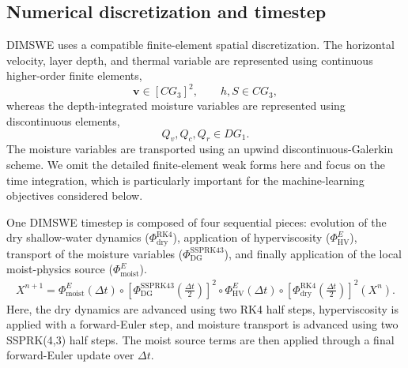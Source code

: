 \documentclass[12pt]{article}
\begin{document}
\subsection{Numerical discretization and timestep}
DIMSWE uses a compatible finite-element spatial discretization. The horizontal velocity, layer depth, and thermal variable are represented using continuous higher-order finite elements,
\begin{equation}
	\mathbf{v}\in[CG_3]^2,
	\qquad
	h,S\in CG_3,
\end{equation}
whereas the depth-integrated moisture variables are represented using discontinuous elements,
\begin{equation}
	Q_v,Q_c,Q_r\in DG_1.
\end{equation}
The moisture variables are transported using an upwind discontinuous-Galerkin scheme. We omit the detailed finite-element weak forms here and focus on the time integration, which is particularly important for the machine-learning objectives considered below.

One DIMSWE timestep is composed of four sequential pieces: evolution of the dry shallow-water dynamics ($\Phi_{\mathrm{dry}}^{\mathrm{RK4}}$), application of hyperviscosity ($\Phi_{\mathrm{HV}}^{E}$), transport of the moisture variables ($\Phi_{\mathrm{DG}}^{\mathrm{SSPRK43}}$), and finally application of the local moist-physics source ($\Phi_{\mathrm{moist}}^{E}$).
\begin{equation}
	\begin{split}
		X^{n+1}
		=
		\Phi_{\mathrm{moist}}^{E}(\Delta t)
		\circ
		\left[
		\Phi_{\mathrm{DG}}^{\mathrm{SSPRK43}}
		\left(\frac{\Delta t}{2}\right)
		\right]^2
		\circ
		\Phi_{\mathrm{HV}}^{E}(\Delta t)
		\circ
		\left[
		\Phi_{\mathrm{dry}}^{\mathrm{RK4}}
		\left(\frac{\Delta t}{2}\right)
		\right]^2
		(X^n).
		\label{eq:dimswe_timestep}
	\end{split}
\end{equation}
Here, the dry dynamics are advanced using two RK4 half steps, hyperviscosity is applied with a forward-Euler step, and moisture transport is advanced using two SSPRK(4,3) half steps. The moist source terms are then applied through a final forward-Euler update over $\Delta t$. 
\end{document}
